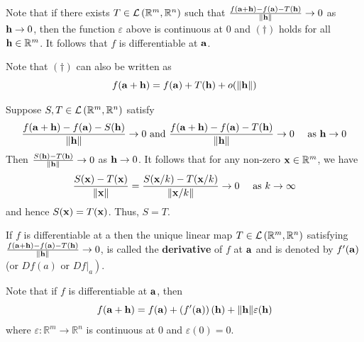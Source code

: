 \documentclass[a4paper,11pt]{article}
\begin{document}
Note that if there exists $T \in {\mathcal{L}}\left(\mathbb{R}^{m}, \mathbb{R}^{n}\right)$ such that $\frac{f({\bf a}+{\bf h})-f({\bf a})-T({\bf h})}{\|{\bf h}\|} \rightarrow 0$ as ${\bf h} \rightarrow 0$, then the function $\varepsilon$ above is continuous at 0 and $(\dagger)$ holds for all ${\bf h} \in \mathbb{R}^{m}$. It follows that $f$ is differentiable at ${\bf a}$.

Note that $(\dagger)$ can also be written as
$$
f({\bf a}+{\bf h})=f({\bf a})+T({\bf h})+o(\|{\bf h}\|)
$$

\begin{note}
    Suppose $S, T \in {\mathcal{L}}\left(\mathbb{R}^{m}, \mathbb{R}^{n}\right)$ satisfy
$$
\frac{f({\bf a}+{\bf h})-f({\bf a})-S({\bf h})}{\|{\bf h}\|} \rightarrow 0 \text { and } \frac{f({\bf a}+{\bf h})-f({\bf a})-T({\bf h})}{\|{\bf h}\|} \rightarrow 0 \quad \text { as } {\bf h} \rightarrow 0
$$
Then $\frac{S({\bf h})-T({\bf h})}{\|{\bf h}\|} \rightarrow 0$ as ${\bf h} \rightarrow 0$. It follows that for any non-zero ${\bf x} \in \mathbb{R}^{m}$, we have
$$
\frac{S({\bf x})-T({\bf x})}{\|{\bf x}\|}=\frac{S({\bf x} / k)-T({\bf x} / k)}{\|{\bf x} / k\|} \rightarrow 0 \quad \text { as } k \rightarrow \infty
$$
and hence $S({\bf x})=T({\bf x})$. Thus, $S=T$.
\end{note}

\begin{definition}
    If $f$ is differentiable at a then the unique linear map $T \in {\mathcal{L}}\left(\mathbb{R}^{m}, \mathbb{R}^{n}\right)$ satisfying $\frac{f({\bf a}+{\bf h})-f({\bf a})-T({\bf h})}{\|{\bf h}\|} \rightarrow 0$, is called the \textbf{derivative} of $f$ at ${\bf a}$ and is denoted by $f^{\prime}({\bf a})$ (or $D f(a)$ or $\left.\left.D f\right|_{a}\right)$.
\end{definition}

Note that if $f$ is differentiable at ${\bf a}$, then
$$
f({\bf a}+{\bf h})=f({\bf a})+\left(f^{\prime}({\bf a})\right)({\bf h})+\|{\bf h}\| \varepsilon({\bf h})
$$
where $\varepsilon: \mathbb{R}^{m} \rightarrow \mathbb{R}^{n}$ is continuous at 0 and $\varepsilon(0)=0$.
\end{document}

